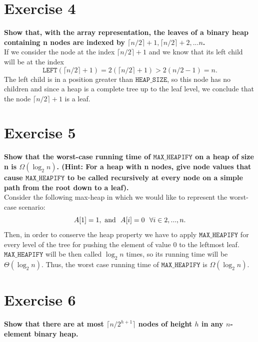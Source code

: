 \documentclass{article}
\begin{document}
	\section*{Exercise 4}
	\textbf{Show that, with the array representation, the leaves of a
	binary heap containing n nodes are indexed by $\lceil n/2 \rceil + 1, \lceil n/2 \rceil + 2, . . . n$.} \\



	\noindent If we consider the node at the index $ \lceil n/2 \rceil +1$ and we know that its left child will be at the index 
	$$ 
	\mathtt{LEFT}( \lceil n/2 \rceil +1 ) = 2(\lceil n/2 \rceil +1) > 2(n/2 - 1) = n.
	$$
	The left child is in a position greater than $\mathtt{HEAP\_SIZE}$, so this node has no children and since a heap is a complete tree up to the leaf level, we conclude that the node $ \lceil n/2 \rceil +1$ is a leaf.
	
	\section*{Exercise 5}
	\textbf{Show that the worst-case running time of $\mathtt{MAX\_HEAPIFY}$ on a heap of size n is $\Omega(\log_2 n)$.  (Hint: For a heap with n nodes, give node values that cause $\mathtt{MAX\_HEAPIFY}$ to be called recursively at every node on a simple path from the root down to a leaf).} \\
	
	\noindent Consider the following max-heap in which we would like to represent the worst-case scenario:
	$$
	A[1] = 1, ~ \textmd{and} ~~ A[i] = 0 ~~ \forall i \in {2,..., n}.
	$$
	Then, in order to conserve the heap property we have to apply $\mathtt{MAX\_HEAPIFY}$ for every level of the tree  for pushing the element of value 0 to the leftmost leaf. $\mathtt{MAX\_HEAPIFY}$ will be then called $\log_2n$ times, so its running time will be $\Theta (\log_2n)$. Thus, the worst case running time of $\mathtt{MAX\_HEAPIFY}$ is $\Omega(\log_2n)$.
	
	\section*{Exercise 6}
	\textbf{Show that there are at most $\lceil n/2^{h+1} \rceil$ nodes of height $h$ in any $n$-element binary heap.} \\
	
\end{document}
